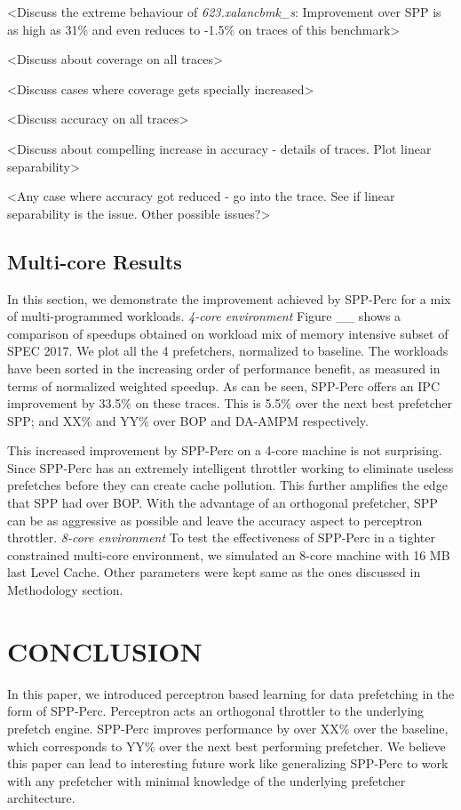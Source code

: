 \documentclass{sig-alternate}
\begin{document}
<Discuss the extreme behaviour of \textit{623.xalancbmk\_s}: Improvement over SPP is as high as 31\% and even reduces to -1.5\% on traces of this benchmark>

<Discuss about coverage on all traces>

<Discuss cases where coverage gets specially increased>

<Discuss accuracy on all traces>

<Discuss about compelling increase in accuracy - details of traces. Plot linear separability>

<Any case where accuracy got reduced - go into the trace. See if linear separability is the issue. Other possible issues?>


\subsection{Multi-core Results}
In this section, we demonstrate the improvement achieved by SPP-Perc for a mix of multi-programmed workloads. 
\newline \newline
\textit{4-core environment}
Figure \_\_ shows a comparison of speedups obtained on workload mix of memory intensive subset of SPEC 2017. 
We plot all the 4 prefetchers, normalized to baseline. 
The workloads have been sorted in the increasing order of performance benefit, as measured in terms of normalized weighted speedup. 
As can be seen, SPP-Perc offers an IPC improvement by 33.5\% on these traces. 
This is 5.5\% over the next best prefetcher SPP; and XX\% and YY\% over BOP and DA-AMPM respectively.

This increased improvement by SPP-Perc on a 4-core machine is not surprising. 
Since SPP-Perc has an extremely intelligent throttler working to eliminate useless prefetches before they can create cache pollution. 
This further amplifies the edge that SPP had over BOP. 
With the advantage of an orthogonal prefetcher, SPP can be as aggressive as possible and leave the accuracy aspect to perceptron throttler.
\newline \newline
\textit{8-core environment}
To test the effectiveness of SPP-Perc in a tighter constrained multi-core environment, we simulated an 8-core machine with 16 MB last Level Cache. 
Other parameters were kept same as the ones discussed in Methodology section.


\section{CONCLUSION}
In this paper, we introduced perceptron based learning for data prefetching in the form of SPP-Perc. 
Perceptron acts an orthogonal throttler to the underlying prefetch engine. 
SPP-Perc improves performance by over XX\% over the baseline, which corresponds to YY\% over the next best performing prefetcher. 
We believe this paper can lead to interesting future work like generalizing SPP-Perc to work with any prefetcher with minimal knowledge of the underlying prefetcher architecture.


\end{document}
